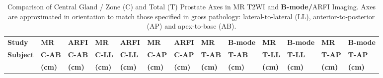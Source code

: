 \begin{table}
\centering
\caption{Comparison of Central Gland / Zone (C) and Total (T) Prostate Axes in
    MR T2WI and \textbf{B-mode/}ARFI Imaging.  Axes are approximated in orientation to
    match those specified in gross pathology: lateral-to-lateral (LL),
    anterior-to-posterior (AP) and apex-to-base (AB).}
\begin{tabular}{|l|l|l|l|l|l|l|l|l|l|l|l|l|} \hline
{\bf Study} & {\bf MR} & {\bf ARFI} & {\bf MR} & {\bf ARFI} & {\bf MR} & {\bf ARFI} & {\bf MR} & {\bf B-mode} & {\bf MR} & {\bf B-mode} & {\bf MR} & {\bf B-mode} \\ 
{\bf Subject} & {\bf C-AB} & {\bf C-AB} & {\bf C-LL} & {\bf C-LL} & {\bf C-AP} & {\bf C-AP} & {\bf T-AB} & {\bf T-AB} & {\bf T-LL} & {\bf T-LL} & {\bf T-AP} & {\bf T-AP} \\
 & {\bf (cm)} & {\bf (cm)} & {\bf (cm)} & {\bf (cm)} & {\bf (cm)} & {\bf (cm)} & {\bf (cm)} & {\bf (cm)} & {\bf (cm)} & {\bf (cm)} & {\bf (cm)} & {\bf (cm)} \\ \hline

\hline
\end{tabular}
\label{tab:mr_arfi_axes}
\end{table}
